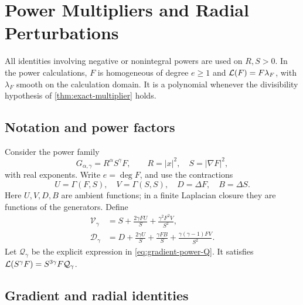 \section[Power Multipliers]{Power Multipliers and Radial Perturbations}
\label{app:power-identities}

All identities involving negative or nonintegral powers are used on
\(R,S>0\).  In the power calculations, \(F\) is homogeneous of
degree \(e\geq1\) and \(\mathcal L(F)=F\lambda_F\), with \(\lambda_F\)
smooth on the calculation domain.  It is a polynomial whenever the
divisibility hypothesis of \cref{thm:exact-multiplier} holds.

\subsection{Notation and power factors}

Consider the power family
\begin{equation}\label{eq:power-family}
 G_{\alpha,\gamma}=R^\alpha S^\gamma F,
 \qquad R=|x|^2,\quad S=|\nabla F|^2,
\end{equation}
with real exponents.
Write \(e=\deg F\), and use the contractions
\[
 U=\Gamma(F,S),\quad V=\Gamma(S,S),\quad
 D=\Delta F,\quad B=\Delta S.
\]
Here \(U,V,D,B\) are ambient functions; in a finite Laplacian closure
they are functions of the generators.  Define
\begin{align}
 \mathcal V_\gamma
 &=S+\frac{2\gamma FU}{S}+\frac{\gamma^2F^2V}{S^2},
 \label{eq:gradient-power-V}\\
 \mathcal D_\gamma
 &=D+\frac{2\gamma U}{S}
       +\frac{\gamma FB}{S}
       +\frac{\gamma(\gamma-1)FV}{S^2}.
 \label{eq:gradient-power-D}
\end{align}
Let \(\mathcal Q_\gamma\) be the explicit expression in
\eqref{eq:gradient-power-Q}.  It satisfies
\(\mathcal L(S^\gamma F)=S^{3\gamma}F\mathcal Q_\gamma\).

\subsection{Gradient and radial identities}

